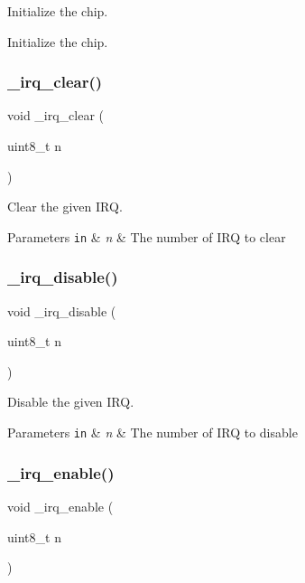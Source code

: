 Initialize the chip. 

Initialize the chip. \mbox{\label{group___h_p_l_ga80f1b1a044a8773e23b38517296620b4}} 
\subsubsection{\texorpdfstring{\+\_\+irq\+\_\+clear()}{\_irq\_clear()}}
{\footnotesize\ttfamily void \+\_\+irq\+\_\+clear (\begin{DoxyParamCaption}\item[{uint8\+\_\+t}]{n }\end{DoxyParamCaption})}



Clear the given I\+RQ. 


\begin{DoxyParams}[1]{Parameters}
\mbox{\tt in}  & {\em n} & The number of I\+RQ to clear \\
\hline
\end{DoxyParams}
\mbox{\label{group___h_p_l_gae6a80cff8a450795dc3f2d6df1a19464}} 
\subsubsection{\texorpdfstring{\+\_\+irq\+\_\+disable()}{\_irq\_disable()}}
{\footnotesize\ttfamily void \+\_\+irq\+\_\+disable (\begin{DoxyParamCaption}\item[{uint8\+\_\+t}]{n }\end{DoxyParamCaption})}



Disable the given I\+RQ. 


\begin{DoxyParams}[1]{Parameters}
\mbox{\tt in}  & {\em n} & The number of I\+RQ to disable \\
\hline
\end{DoxyParams}
\mbox{\label{group___h_p_l_gac8b7aa49ad81aecd34603b4dc23dd143}} 
\subsubsection{\texorpdfstring{\+\_\+irq\+\_\+enable()}{\_irq\_enable()}}
{\footnotesize\ttfamily void \+\_\+irq\+\_\+enable (\begin{DoxyParamCaption}\item[{uint8\+\_\+t}]{n }\end{DoxyParamCaption})}



